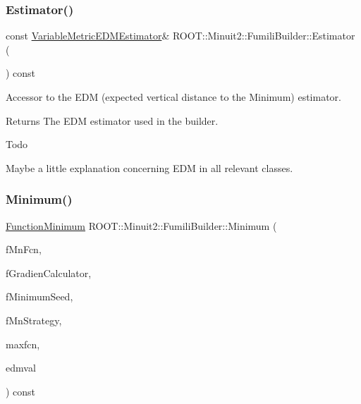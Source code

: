\subsubsection{\texorpdfstring{Estimator()}{Estimator()}\hspace{0.1cm}{\footnotesize\ttfamily [3/3]}}
{\footnotesize\ttfamily const \mbox{\hyperlink{classROOT_1_1Minuit2_1_1VariableMetricEDMEstimator}{Variable\+Metric\+E\+D\+M\+Estimator}}\& R\+O\+O\+T\+::\+Minuit2\+::\+Fumili\+Builder\+::\+Estimator (\begin{DoxyParamCaption}{ }\end{DoxyParamCaption}) const\hspace{0.3cm}{\ttfamily [inline]}}

Accessor to the E\+DM (expected vertical distance to the Minimum) estimator.

\begin{DoxyReturn}{Returns}
The E\+DM estimator used in the builder.
\end{DoxyReturn}
\begin{DoxyRefDesc}{Todo}
\item[\mbox{\hyperlink{todo__todo000017}{Todo}}]Maybe a little explanation concerning E\+DM in all relevant classes.\end{DoxyRefDesc}
\mbox{\label{classROOT_1_1Minuit2_1_1FumiliBuilder_a6e598ea8d57750ec860595ba494bb501}} 
\subsubsection{\texorpdfstring{Minimum()}{Minimum()}\hspace{0.1cm}{\footnotesize\ttfamily [1/6]}}
{\footnotesize\ttfamily \mbox{\hyperlink{classROOT_1_1Minuit2_1_1FunctionMinimum}{Function\+Minimum}} R\+O\+O\+T\+::\+Minuit2\+::\+Fumili\+Builder\+::\+Minimum (\begin{DoxyParamCaption}\item[{const \mbox{\hyperlink{classROOT_1_1Minuit2_1_1MnFcn}{Mn\+Fcn}} \&}]{f\+Mn\+Fcn,  }\item[{const \mbox{\hyperlink{classROOT_1_1Minuit2_1_1GradientCalculator}{Gradient\+Calculator}} \&}]{f\+Gradien\+Calculator,  }\item[{const \mbox{\hyperlink{classROOT_1_1Minuit2_1_1MinimumSeed}{Minimum\+Seed}} \&}]{f\+Minimum\+Seed,  }\item[{const \mbox{\hyperlink{classROOT_1_1Minuit2_1_1MnStrategy}{Mn\+Strategy}} \&}]{f\+Mn\+Strategy,  }\item[{unsigned int}]{maxfcn,  }\item[{double}]{edmval }\end{DoxyParamCaption}) const\hspace{0.3cm}{\ttfamily [virtual]}}

